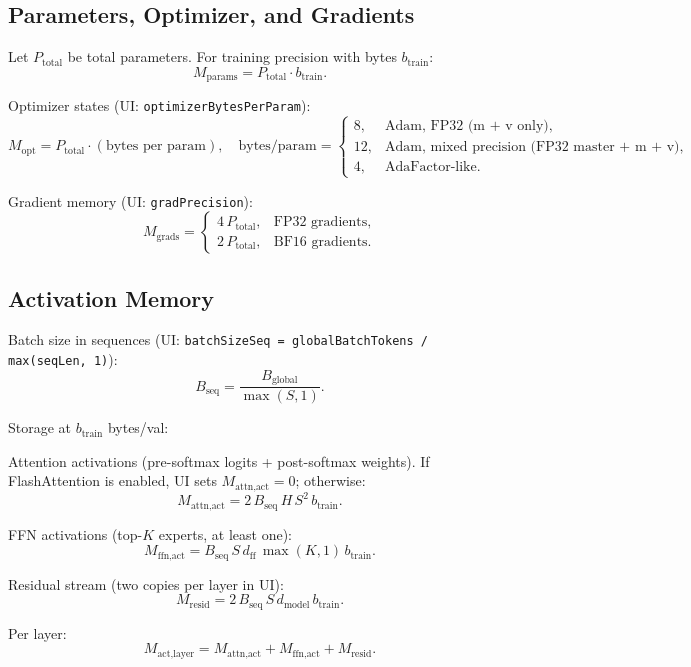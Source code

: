 \documentclass[11pt]{article}
\begin{document}
\subsection{Parameters, Optimizer, and Gradients}

Let $P_{\text{total}}$ be total parameters. For training precision with bytes $b_{\text{train}}$:
\[
M_{\text{params}} = P_{\text{total}} \cdot b_{\text{train}}.
\]

Optimizer states (UI: \texttt{optimizerBytesPerParam}):
\[
M_{\text{opt}} = P_{\text{total}} \cdot (\text{bytes per param}),
\quad
\text{bytes/param} =
\begin{cases}
8,  & \text{Adam, FP32 (m + v only)},\\
12, & \text{Adam, mixed precision (FP32 master + m + v)},\\
4,  & \text{AdaFactor-like}.
\end{cases}
\]

Gradient memory (UI: \texttt{gradPrecision}):
\[
M_{\text{grads}} =
\begin{cases}
4 \, P_{\text{total}}, & \text{FP32 gradients},\\
2 \, P_{\text{total}}, & \text{BF16 gradients}.
\end{cases}
\]

\subsection{Activation Memory}

Batch size in sequences (UI: \texttt{batchSizeSeq = globalBatchTokens / max(seqLen, 1)}):
\[
B_{\text{seq}} = \frac{B_{\text{global}}}{\max(S, 1)}.
\]

Storage at $b_{\text{train}}$ bytes/val:

Attention activations (pre-softmax logits + post-softmax weights). If FlashAttention is enabled, UI sets $M_{\text{attn,act}} = 0$; otherwise:
\[
M_{\text{attn,act}} =
2 \, B_{\text{seq}} \, H \, S^2 \, b_{\text{train}}.
\]

FFN activations (top-$K$ experts, at least one):
\[
M_{\text{ffn,act}} =
B_{\text{seq}} \, S \, d_{\text{ff}} \, \max(K, 1) \, b_{\text{train}}.
\]

Residual stream (two copies per layer in UI):
\[
M_{\text{resid}} =
2 \, B_{\text{seq}} \, S \, d_{\text{model}} \, b_{\text{train}}.
\]

Per layer:
\[
M_{\text{act,layer}} = M_{\text{attn,act}} + M_{\text{ffn,act}} + M_{\text{resid}}.
\]
\end{document}
